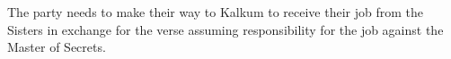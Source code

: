 The party needs to make their way to Kalkum to receive their job from the Sisters in exchange for the verse assuming responsibility for the job against the Master of Secrets.
